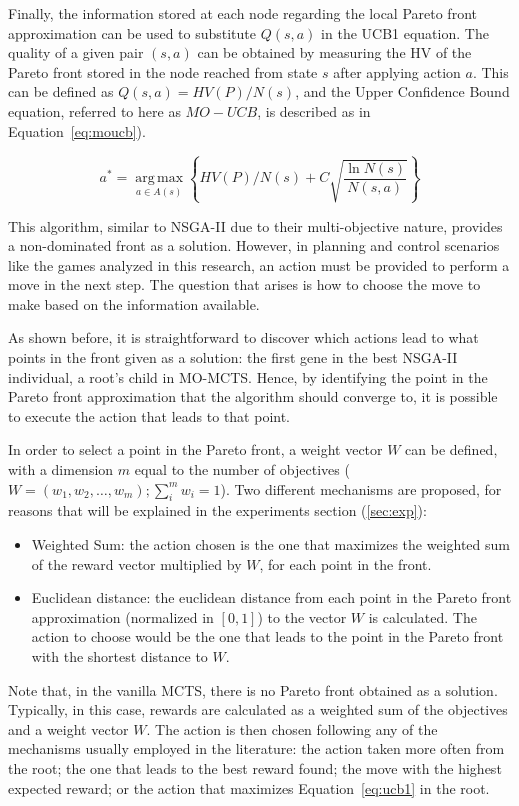 \documentclass[journal]{IEEEtran}
\newcommand{\argmax}{\operatorname*{arg\,max}}
\begin{document}
Finally, the information stored at each node regarding the local Pareto front approximation can be used to substitute $Q(s,a)$ in the UCB1 equation. The quality of a given pair $(s,a)$ can be obtained by measuring the HV of the Pareto front stored in the node reached from state $s$ after applying action $a$. This can be defined as  $Q(s,a) = HV(P)/N(s)$, and the Upper Confidence Bound equation, referred to here as $MO-UCB$, is described as in Equation~\ref{eq:moucb}). 

\begin{equation}	\label{eq:moucb}
a^* = \argmax_{a \in A(s)} \left\{HV(P)/N(s) + C \sqrt{\frac{ \ln N(s) }{ N(s,a) }}\right\}
\end{equation}

This algorithm, similar to NSGA-II due to their multi-objective nature, provides a non-dominated front as a solution. However, in planning and control scenarios like the games analyzed in this research, an action must be provided to perform a move in the next step. The question that arises is how to choose the move to make based on the information available.

As shown before, it is straightforward to discover which actions lead to what points in the front given as a solution: the first gene in the best NSGA-II individual, a root's child in MO-MCTS. Hence, by identifying the point in the Pareto front approximation that the algorithm should converge to, it is possible to execute the action that leads to that point.

In order to select a point in the Pareto front, a weight vector $W$ can be defined, with a dimension $m$ equal to the number of objectives ($W = (w_1, w_2, \dots, w_m); \sum_{i}^{m} w_i = 1$). Two different mechanisms are proposed, for reasons that will be explained in the experiments section (\ref{sec:exp}):

\begin{itemize}
\item Weighted Sum: the action chosen is the one that maximizes the weighted sum of the reward vector multiplied by $W$, for each point in the front.
\item Euclidean distance: the euclidean distance from each point in the Pareto front approximation (normalized in $[0,1]$) to the vector $W$ is calculated. The action to choose would be the one that leads to the point in the Pareto front with the shortest distance to $W$. 
\end{itemize}

Note that, in the vanilla MCTS, there is no Pareto front obtained as a solution. Typically, in this case, rewards are calculated as a weighted sum of the objectives and a weight vector $W$. The action is then chosen following any of the mechanisms usually employed in the literature: the action taken more often from the root; the one that leads to the best reward found; the move with the highest expected reward; or the action that maximizes Equation~\ref{eq:ucb1} in the root.
\end{document}
